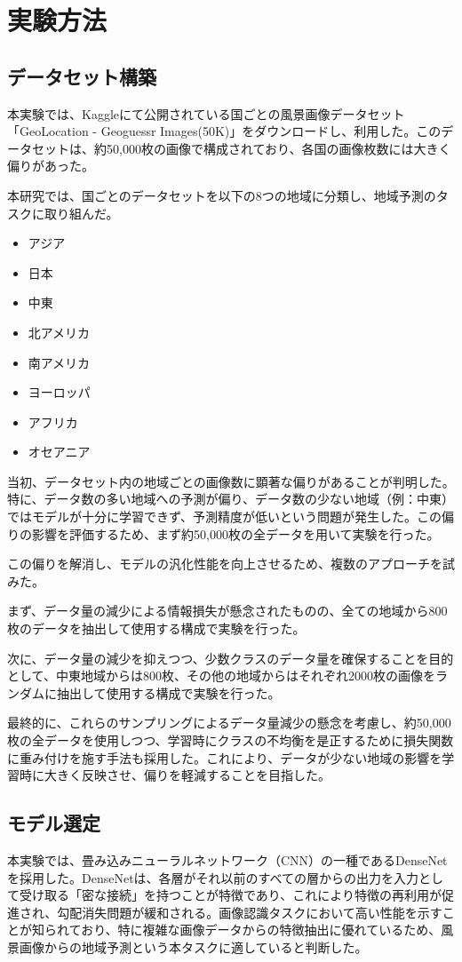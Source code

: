 \documentclass[a4paper, 11pt, titlepage]{jsarticle}
\begin{document}
\section{実験方法}

\subsection{データセット構築}
本実験では、Kaggleにて公開されている国ごとの風景画像データセット「GeoLocation - Geoguessr Images(50K)」\cite{geolocation}をダウンロードし、利用した。このデータセットは、約50,000枚の画像で構成されており、各国の画像枚数には大きく偏りがあった。

本研究では、国ごとのデータセットを以下の8つの地域に分類し、地域予測のタスクに取り組んだ。
\begin{itemize}
    \item アジア
    \item 日本
    \item 中東
    \item 北アメリカ
    \item 南アメリカ
    \item ヨーロッパ
    \item アフリカ
    \item オセアニア
\end{itemize}

当初、データセット内の地域ごとの画像数に顕著な偏りがあることが判明した。特に、データ数の多い地域への予測が偏り、データ数の少ない地域（例：中東）ではモデルが十分に学習できず、予測精度が低いという問題が発生した。この偏りの影響を評価するため、まず約50,000枚の全データを用いて実験を行った。

この偏りを解消し、モデルの汎化性能を向上させるため、複数のアプローチを試みた。

まず、データ量の減少による情報損失が懸念されたものの、全ての地域から800枚のデータを抽出して使用する構成で実験を行った。

次に、データ量の減少を抑えつつ、少数クラスのデータ量を確保することを目的として、中東地域からは800枚、その他の地域からはそれぞれ2000枚の画像をランダムに抽出して使用する構成で実験を行った。

最終的に、これらのサンプリングによるデータ量減少の懸念を考慮し、約50,000枚の全データを使用しつつ、学習時にクラスの不均衡を是正するために損失関数に重み付けを施す手法も採用した。これにより、データが少ない地域の影響を学習時に大きく反映させ、偏りを軽減することを目指した。

\subsection{モデル選定}
本実験では、畳み込みニューラルネットワーク（CNN）の一種であるDenseNetを採用した\cite{densenet_article}。DenseNetは、各層がそれ以前のすべての層からの出力を入力として受け取る「密な接続」を持つことが特徴であり、これにより特徴の再利用が促進され、勾配消失問題が緩和される。画像認識タスクにおいて高い性能を示すことが知られており、特に複雑な画像データからの特徴抽出に優れているため、風景画像からの地域予測という本タスクに適していると判断した。
\end{document}
